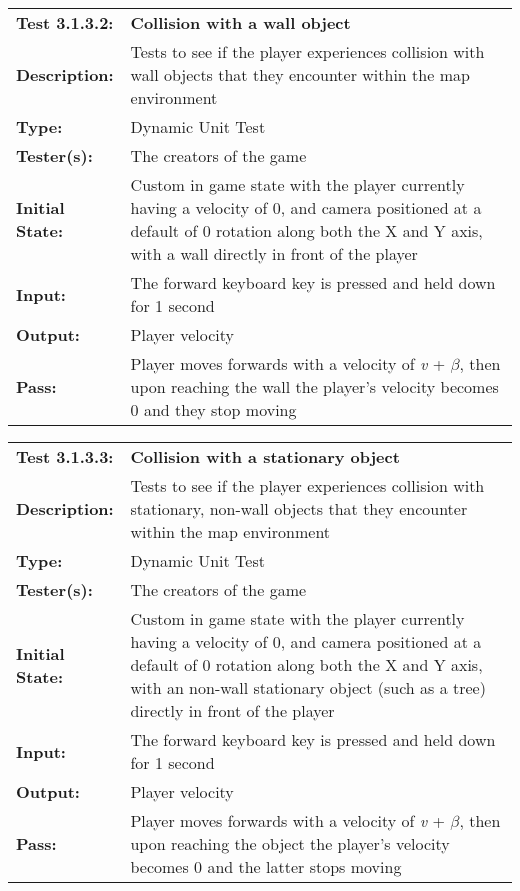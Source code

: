 \documentclass[12pt, titlepage]{article}
\begin{document}
\begin{mdframed}[linewidth=1pt]
\begin{tabularx}{\textwidth}{@{}p{3cm}X@{}}
{\bf Test 3.1.3.2:} & {\bf Collision with a wall object}\\[\baselineskip]
{\bf Description:} & Tests to see if the player experiences collision with wall objects that they encounter within the map environment\\[0.5\baselineskip]
{\bf Type:} & Dynamic Unit Test\\[0.5\baselineskip]
{\bf Tester(s):} & The creators of the game\\[0.5\baselineskip]
{\bf Initial State:} & Custom in game state with the player currently having a velocity of 0, and camera positioned at a default of 0 rotation along both the X and Y axis, with a wall directly in front of the player\\[0.5\baselineskip]
{\bf Input:} & The forward keyboard key is pressed and held down for 1 second \\[0.5\baselineskip]
{\bf Output:} & Player velocity\\[0.5\baselineskip]
{\bf Pass:} & Player moves forwards with a velocity of \textit{v} + $\beta$, then upon reaching the wall the player's velocity becomes 0 and they stop moving
\end{tabularx}
\end{mdframed}

\begin{mdframed}[linewidth=1pt]
\begin{tabularx}{\textwidth}{@{}p{3cm}X@{}}
{\bf Test 3.1.3.3:} & {\bf Collision with a stationary object}\\[\baselineskip]
{\bf Description:} & Tests to see if the player experiences collision with stationary, non-wall objects that they encounter within the map environment\\[0.5\baselineskip]
{\bf Type:} & Dynamic Unit Test\\[0.5\baselineskip]
{\bf Tester(s):} & The creators of the game\\[0.5\baselineskip]
{\bf Initial State:} & Custom in game state with the player currently having a velocity of 0, and camera positioned at a default of 0 rotation along both the X and Y axis, with an non-wall stationary object (such as a tree) directly in front of the player\\[0.5\baselineskip]
{\bf Input:} & The forward keyboard key is pressed and held down for 1 second \\[0.5\baselineskip]
{\bf Output:} & Player velocity\\[0.5\baselineskip]
{\bf Pass:} & Player moves forwards with a velocity of \textit{v} + $\beta$, then upon reaching the object the player's velocity becomes 0 and the latter stops moving
\end{tabularx}
\end{mdframed}
\end{document}
